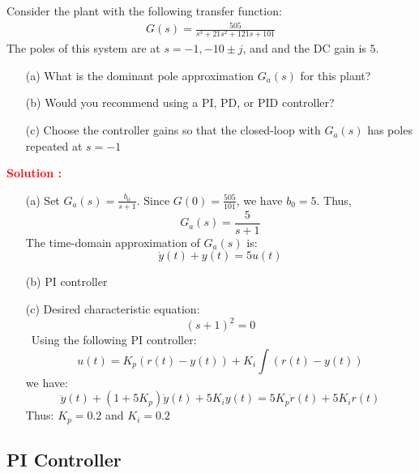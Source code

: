 \documentclass[12pt]{article}
\begin{document}
Consider the plant with the following transfer function:
\begin{align*}
    G(s) = \frac{505}{s^3+21s^2+121s+101}
\end{align*}
The poles of this system are at \(s = -1, -10 \pm j\), and  and the DC gain is $5$.
\begin{itemize}
    \item[(a)] What is the dominant pole approximation \(G_a(s)\) for this plant?
    \item[(b)] Would you recommend using a PI, PD, or PID controller?
    \item[(c)] Choose the controller gains so that the closed-loop with \(G_a(s)\) has poles repeated at \(s = -1\)
\end{itemize}
\textbf{\textcolor{red}{Solution :}} 
\begin{itemize}
    \item[(a)] Set \(G_a(s) = \frac{b_0}{s+1}\). Since \(G(0) = \frac{505}{101}\), we have \(b_0 = 5\). Thus,
\begin{equation}
    G_a(s) = \frac{5}{s+1}
\end{equation}
The time-domain approximation of \(G_a(s)\) is:
\begin{equation}
    \dot{y}(t) + y(t) = 5 u(t)
\end{equation}
    \item[(b)]  PI controller
    \item[(c)] Desired characteristic equation:
    \[ (s+1)^2 = 0\]\
    Using the following PI controller:
    \[u(t) = K_p (r(t)-y(t)) + K_i \int (r(t)-y(t))\]
    we have:
    \[\ddot{y}(t) + (1+5K_p)\dot{y}(t) + 5K_i y(t) = 5K_p \dot{r}(t) + 5K_i r(t)\]
    Thus:
    \(K_p = 0.2\) and \(K_i = 0.2\)
\end{itemize}

\clearpage
\subsection{PI Controller}
\end{document}

